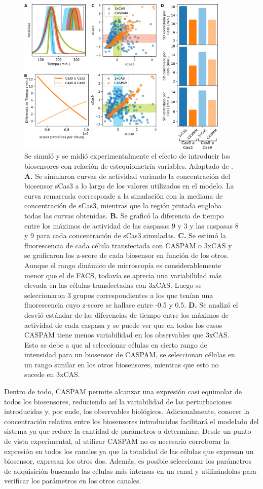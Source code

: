 \begin{figure}[htb]
    \centering
    \includegraphics[width=0.9\textwidth]{img/cap_3/variabilidad.png}
    \caption{\footnotesize{Se simuló y se midió experimentalmente el efecto de introducir los biosensores con relación de estequiometría variables. Adaptado de \cite{Habif2021}. \textbf{A.} Se simularon curvas de actividad variando la concentración del biosensor sCas3 a lo largo de los valores utilizados en el modelo. La curva remarcada corresponde a la simulación con la mediana de concentración de sCas3, mientras que la región pintada engloba todas las curvas obtenidas. \textbf{B.} Se graficó la diferencia de tiempo entre los máximos de actividad de las caspasas 9 y 3 y las caspasas 8 y 9 para cada concentración de sCas3 simuladas. \textbf{C.} Se estimó la fluorescencia de cada célula transfectada con CASPAM o 3xCAS y se graficaron los z-score de cada biosensor en función de los otros. Aunque el rango dinámico de microscopía es considerablemente menor que el de FACS, todavía se aprecia una variabilidad más elevada en las células transfectadas con 3xCAS. Luego se seleccionaron 3 grupos correspondientes a los que tenían una fluorescencia cuyo z-score se hallase entre -0.5 y 0.5. \textbf{D.} Se analizó el desvió estándar de las diferencias de tiempo entre los máximos de actividad de cada caspasa y se puede ver que en todos los casos CASPAM tiene menos variabilidad en los observables que 3xCAS. Esto se debe a que al seleccionar células en cierto rango de intensidad para un biosensor de CASPAM, se seleccionan células en un rango similar en los otros biosensores, mientras que esto no sucede en 3xCAS.}}
    \label{fig:variabilidad}
\end{figure}

Dentro de todo, CASPAM permite alcanzar una expresión casi equimolar de todos los biosensores, reduciendo así la variabilidad de las perturbaciones introducidas y, por ende, los observables biológicos. Adicionalmente, conocer la concentración relativa entre los biosensores introducidos facilitará el modelado del sistema ya que reduce la cantidad de parámetros a determinar. Desde un punto de vista experimental, al utilizar CASPAM no es necesario corroborar la expresión en todos los canales ya que la totalidad de las células que expresan un biosensor, expresan los otros dos. Además, es posible seleccionar los parámetros de adquisición buscando las células más intensas en un canal y utilizándolas para verificar los parámetros en los otros canales.